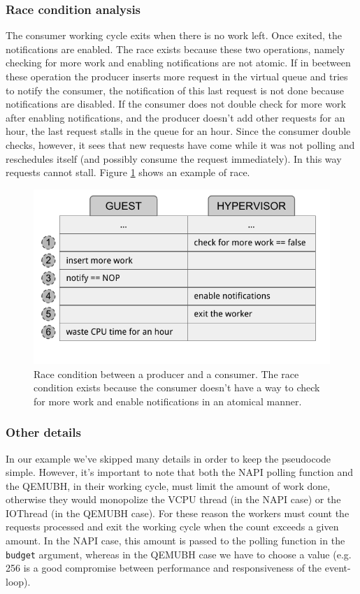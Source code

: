\subsubsection{Race condition analysis}
The consumer working cycle exits when there is no work left. Once exited, the notifications are enabled. The race exists because these
two operations, namely checking for more work and enabling notifications are not atomic. If in beetween these operation the producer
inserts more request in the virtual queue and tries to notify the consumer, the notification of this last request is not done because 
notifications are disabled. If the consumer does not double check for more work after enabling notifications, and the producer doesn't
add other requests for an hour, the last request stalls in the queue for an hour. Since the consumer double checks, however, it sees
that new requests have come while it was not polling and reschedules itself (and possibly consume the request immediately). In this
way requests cannot stall. Figure \ref{fig:race} shows an example of race.

\begin{figure}[bt]
\centering
\includegraphics[scale = 1.0]{race.pdf}
\caption{Race condition between a producer and a consumer. The race condition exists because the consumer doesn't have a way to check for
	 more work and enable notifications in an atomical manner.}
\label{fig:race}
\end{figure}


\subsubsection{Other details}
In our example we've skipped many details in order to keep the pseudocode simple. However, it's important to note that both the NAPI
polling function and the QEMUBH, in their working cycle, must limit the amount of work done, otherwise they would monopolize the VCPU
thread (in the NAPI case) or the IOThread (in the QEMUBH case). For these reason the workers must count the requests processed and
exit the working cycle when the count exceeds a given amount. In the NAPI case, this amount is passed to the polling function in the
\texttt{budget} argument, whereas in the QEMUBH case we have to choose a value (e.g. 256 is a good compromise between performance and
responsiveness of the event-loop).



